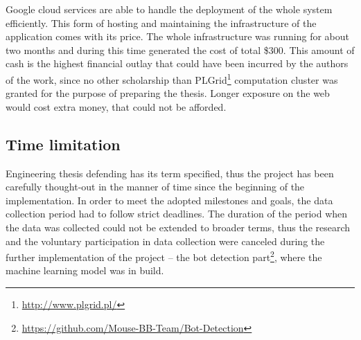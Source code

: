 Google cloud services are able to handle the deployment of the whole system efficiently.
This form of hosting and maintaining the infrastructure of the application comes with its price.
The whole infrastructure was running for about two months and during this time generated the cost of total \$\num{300}.
This amount of cash is the highest financial outlay that could have been incurred by the authors of the work, since no other scholarship than PLGrid\footnote{\url{http://www.plgrid.pl/}} computation cluster was granted for the purpose of preparing the thesis.
Longer exposure on the web would cost extra money, that could not be afforded.

\subsection{Time limitation}
Engineering thesis defending has its term specified, thus the project has been carefully thought-out in the manner of time since the beginning of the implementation.
In order to meet the adopted milestones and goals, the data collection period had to follow strict deadlines.
The duration of the period when the data was collected could not be extended to broader terms, thus the research and the voluntary participation in data collection were canceled during the further implementation of the project – the bot detection part\footnote{\url{https://github.com/Mouse-BB-Team/Bot-Detection}}, where the machine learning model was in build.
